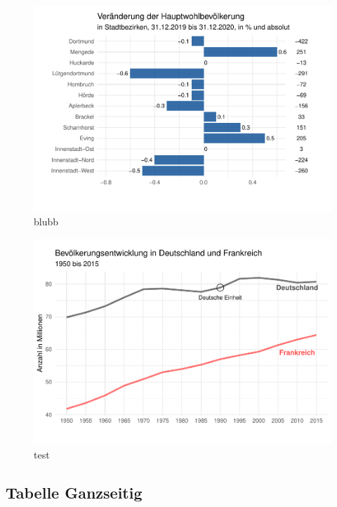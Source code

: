 \documentclass[
  a4paper,
  twoside]{article}
\begin{document}
\begin{figure}
\includegraphics[width=1\linewidth]{2021-03-02_Beispiel_files/figure-latex/unnamed-chunk-3-1} \caption{blubb}\label{fig:unnamed-chunk-3}
\end{figure}

\begin{figure}
\includegraphics[width=1\linewidth]{2021-03-02_Beispiel_files/figure-latex/unnamed-chunk-4-1} \caption{test}\label{fig:unnamed-chunk-4}
\end{figure}

\newpage

\hypertarget{tabelle-ganzseitig}{%
\subsection{Tabelle Ganzseitig}\label{tabelle-ganzseitig}}
\end{document}
